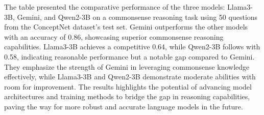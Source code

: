 The table presented the comparative performance of the three models: Llama3-3B, Gemini, and Qwen2-3B on a commonsense reasoning task using 50 questions from the ConceptNet dataset's test set. Gemini outperforms the other models with an accuracy of 0.86, showcasing superior commonsense reasoning capabilities. Llama3-3B achieves a competitive 0.64, while Qwen2-3B follows with 0.58, indicating reasonable performance but a notable gap compared to Gemini.
They emphasize the strength of Gemini in leveraging commonsense knowledge effectively, while Llama3-3B and Qwen2-3B demonstrate moderate abilities with room for improvement. 
The results highlights the potential of advancing model architectures and training methods to bridge the gap in reasoning capabilities, paving the way for more robust and accurate language models in the future.